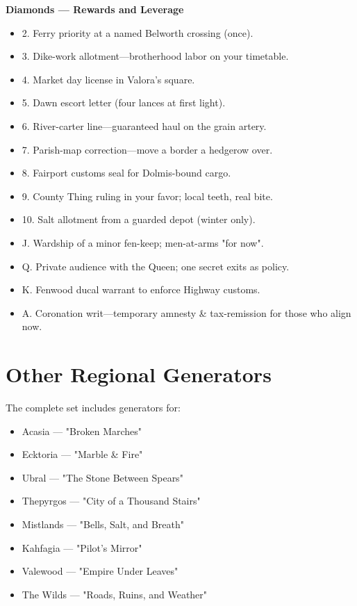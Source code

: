 \textbf{Diamonds — Rewards and Leverage}
\begin{itemize}
  \item 2. Ferry priority at a named Belworth crossing (once).
  \item 3. Dike-work allotment—brotherhood labor on your timetable.
  \item 4. Market day license in Valora's square.
  \item 5. Dawn escort letter (four lances at first light).
  \item 6. River-carter line—guaranteed haul on the grain artery.
  \item 7. Parish-map correction—move a border a hedgerow over.
  \item 8. Fairport customs seal for Dolmis-bound cargo.
  \item 9. County Thing ruling in your favor; local teeth, real bite.
  \item 10. Salt allotment from a guarded depot (winter only).
  \item J. Wardship of a minor fen-keep; men-at-arms "for now".
  \item Q. Private audience with the Queen; one secret exits as policy.
  \item K. Fenwood ducal warrant to enforce Highway customs.
  \item A. Coronation writ—temporary amnesty & tax-remission for those who align now.
\end{itemize}

\section{Other Regional Generators}

The complete set includes generators for:
\begin{itemize}
  \item Acasia — "Broken Marches"
  \item Ecktoria — "Marble & Fire"
  \item Ubral — "The Stone Between Spears"
  \item Thepyrgos — "City of a Thousand Stairs"
  \item Mistlands — "Bells, Salt, and Breath"
  \item Kahfagia — "Pilot's Mirror"
  \item Valewood — "Empire Under Leaves"
  \item The Wilds — "Roads, Ruins, and Weather"
\end{itemize}

